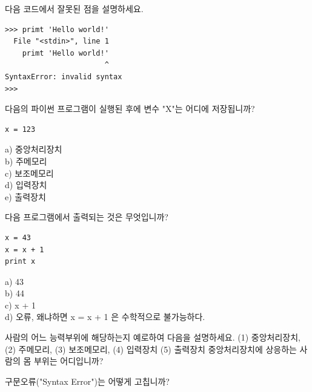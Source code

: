 \begin{ex}
 다음 코드에서 잘못된 점을 설명하세요.

\beforeverb
\begin{verbatim}
>>> primt 'Hello world!'
  File "<stdin>", line 1
    primt 'Hello world!'
                       ^
SyntaxError: invalid syntax
>>> 
\end{verbatim}
\afterverb

\end{ex}

\begin{ex}
다음의 파이썬 프로그램이 실행된 후에 변수 "X"는 어디에 저장됩니까?

\beforeverb
\begin{verbatim}
x = 123
\end{verbatim}
\afterverb
%
a) 중앙처리장치\\
b) 주메모리\\
c) 보조메모리\\
d) 입력장치\\
e) 출력장치
\end{ex}

\begin{ex}
다음 프로그램에서 출력되는 것은 무엇입니까?

\beforeverb
\begin{verbatim}
x = 43
x = x + 1
print x
\end{verbatim}
\afterverb
%
a) 43\\
b) 44\\
c) x + 1\\
d) 오류, 왜냐하면 x = x + 1 은 수학적으로 불가능하다.
\end{ex}

\begin{ex}
사람의 어느 능력부위에 해당하는지 예로하여 다음을 설명하세요.
(1) 중앙처리장치, (2) 주메모리, (3) 보조메모리, 
(4) 입력장치
(5) 출력장치
중앙처리장치에 상응하는 사람의 몸 부위는 어디입니까? 
\end{ex}

\begin{ex}
구문오류("Syntax Error")는 어떻게 고칩니까?
\end{ex}


